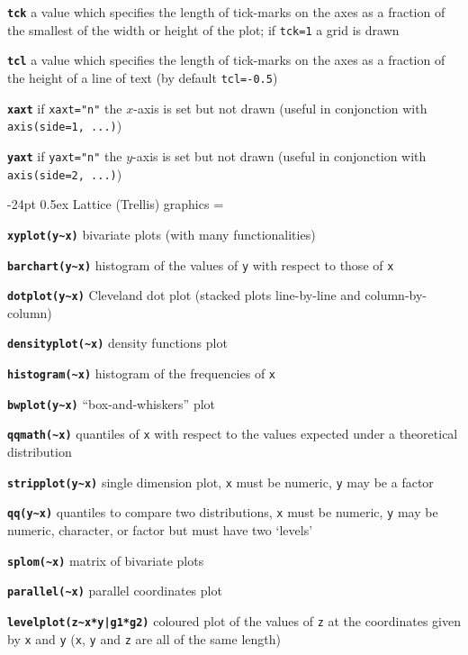 \documentclass[10pt,landscape]{article}
\makeatletter
\renewcommand\section{\@startsection{section}{1}{0mm}%
                                     {-24pt}%
                                     {0.5ex}%
                                {\color{blue}\normalfont\large\bfseries}}
\newcommand{\code}{\texttt}
\newcommand{\bcode}[1]{\texttt{\textbf{#1}}}
\makeatother
\begin{document}
\begin{multicols*}{3}
\bcode{tck}  a value which specifies the length of tick-marks on the axes as a fraction of the smallest of the width or height of the plot; if \code{tck=1} a grid is drawn

\bcode{tcl}  a value which specifies the length of tick-marks on the axes as a fraction of the height of a line of text (by default \code{tcl=-0.5})

\bcode{xaxt}  if \code{xaxt="n"} the $x$-axis is set but not drawn (useful in conjonction with \code{axis(side=1, ...)})

\bcode{yaxt}  if \code{yaxt="n"} the $y$-axis is set but not drawn (useful in conjonction with \code{axis(side=2, ...)})





\section{Lattice (Trellis) graphics}
\everypar={\hangindent=9mm}

\bcode{xyplot(y\~{}x)}  bivariate plots (with many functionalities)

\bcode{barchart(y\~{}x)}  histogram of the values of \code{y} with
respect to those of \code{x}

\bcode{dotplot(y\~{}x)}  Cleveland dot plot (stacked plots line-by-line
and column-by-column)

\bcode{densityplot(\~{}x)}  density functions plot

\bcode{histogram(\~{}x)}  histogram of the frequencies of \code{x}

\bcode{bwplot(y\~{}x)}  ``box-and-whiskers'' plot

\bcode{qqmath(\~{}x)}  quantiles of \code{x} with respect to the values expected under a theoretical distribution

\bcode{stripplot(y\~{}x)}  single dimension plot, \code{x} must be numeric, \code{y} may be a factor

\bcode{qq(y\~{}x)}  quantiles to compare two distributions, \code{x} must be numeric, \code{y} may be numeric, character, or factor but must have two `levels'

\bcode{splom(\~{}x)}  matrix of bivariate plots

\bcode{parallel(\~{}x)}  parallel coordinates plot

\bcode{levelplot(z\~{}x*y|g1*g2)}  coloured plot of the values of \code{z} at the coordinates given by \code{x} and \code{y} (\code{x}, \code{y} and \code{z} are all of the same length)


\end{multicols*}
\end{document}
